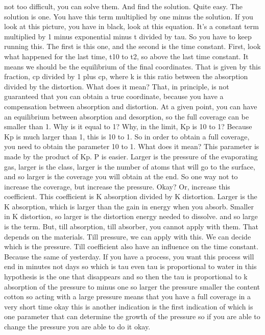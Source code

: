 not too difficult, you can solve them. And find the solution. Quite easy. The solution is one. You have this term multiplied by one minus the solution.
If you look at this picture, you have in black, look at this equation. It's a constant term multiplied by 1 minus exponential minus t divided by tau. So you have to keep running this. The first is this one, and the second is the time constant. First, look what happened for the last time, t10 to t2, so above the last time constant. It means we should be the equilibrium of the final coordinates. That is given by this fraction, cp divided by 1 plus cp, where k is this ratio between the absorption divided by the distortion. What does it mean? That, in principle, is not guaranteed that you can obtain a true coordinate, because you have a compensation between absorption and distortion. At a given point, you can have an equilibrium between absorption and desorption, so the full coverage can be smaller than 1. Why is it equal to 1? Why, in the limit, Kp is 10 to 1? Because Kp is much larger than 1, this is 10 to 1. So in order to obtain a full coverage, you need to obtain the parameter 10 to 1. What does it mean? This parameter is made by the product of Kp. P is easier. Larger is the pressure of the evaporating gas, larger is the class, larger is the number of atoms that will go to the surface, and so larger is the coverage you will obtain at the end. So one way not to increase the coverage, but increase the pressure. Okay? Or, increase this coefficient. This coefficient is K absorption divided by K distortion. Larger is the K absorption, which is larger than the gain in energy when you absorb. Smaller in K distortion, so larger is the distortion energy needed to dissolve. and so large is the term. But, till absorption, till absorber, you cannot apply with them. That depends on the materials. Till pressure, we can apply with this. We can decide which is the pressure. Till coefficient also have an influence on the time constant. Because the same of yesterday. If you have a process, you want this process will end in minutes not days so which is tau even tau is proportional to water in this hypothesis is the one that disappears and so then the tau is proportional to k absorption of the pressure to minus one so larger the pressure smaller the content cotton so acting with a large pressure means that you have a full coverage in a very short time okay this is another indication is the first indication of which is one parameter that can determine the growth of the pressure so if you are able to change the pressure you are able to do it okay.
